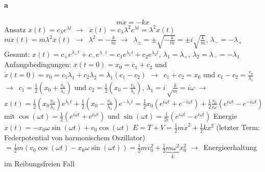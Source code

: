 \documentclass[oneside]{book}
\theoremstyle{definition}
\newcommand{\conseq}{$\rightarrow$~}
\begin{document}
\paragraph{a}
$$m \ddot{x} = -kx$$
Ansatz $x(t) = c_\lambda e^{\lambda t}$ \conseq $\ddot{x}(t) = c_\lambda \lambda^2 e^{\lambda t} = \lambda^2 x(t)$\\
$m \ddot{x}(t) = m \lambda^2 x(t)$ \conseq $\lambda^2 = - \frac{k}{m}$
\conseq $\lambda_{\pm} = \pm \sqrt{- \frac{k}{m}} = \pm i \sqrt{\frac{k}{m}}$, $\lambda_{-} = - \lambda_{+}$
Gesamt: $x(t) = c_+ e^{\lambda_+ t} + c_- e^{\lambda_- t} = c_1 e^{\lambda_1 t} + c_2 e^{\lambda_2 t}$, $\lambda_1 = \lambda_+$, $\lambda_2 = \lambda_- = - \lambda_1$
Anfangsbedingungen: $x(t = 0) = x_0 = c_1 + c_2$ und $\dot{x}(t = 0) = v_0 = c_1 \lambda_1 + c_2 \lambda_2 = \lambda_1 (c_1 - c_2) $
\conseq $c_1+c_2 = x_0$ und $c_1 - c_2 = \frac{v_0}{\lambda_1}$
\conseq $c_1 = \frac12 (x_0 + \frac{v_0}{\lambda_1})$ und $c_2 = \frac12 (x_0 - \frac{v_0}{\lambda_1})$, $\lambda_1 = i \sqrt\frac{k}{m} = i \omega$
\conseq $x(t) = \frac{1}{2} (x_0 \frac{v_0}{\lambda_1})e^{\lambda_1 t} + \frac12 (x_0 - \frac{v_0}{\lambda_1})e^{-\lambda_1 t} = \frac{1}{2} x_0 (e^{i \omega t} + e^{-i\omega t}) + \frac12 \frac{v_0}{i\omega}(e^{i \omega t} - e^{-i\omega t})$
mit $\cos(\omega t) = \frac{1}{2} (e^{i \omega t} + e^{i \omega t})$ und $\sin(\omega t) = \frac{1}{2i} (e^{i \omega t} - e^{i \omega t})$
Energie $\dot{x}(t) = - x_0 \omega \sin(\omega t) + v_0 \cos(\omega t)$
$E = T + V = \frac12 m\dot{x}^2 + \frac12 k x^2$ (letzter Term: Federpotential von harmonischem Oszillator)
$ = \frac{1}{2} m (v_0 \cos(\omega t) - x_0 \omega \sin(\omega t)) = \frac{1}{2} m v_0^2 + \frac12 \underbrace{m \omega^2}_{k} x_0^2$ \conseq Energieerhaltung im Reibungsfreien Fall
\end{document}
